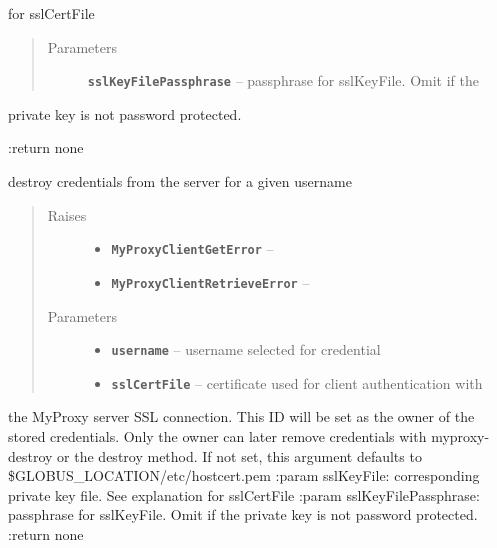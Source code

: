 \documentclass[letterpaper,10pt,english]{sphinxmanual}
\begin{document}
\begin{fulllineitems}
\begin{fulllineitems}
\begin{quote}
\begin{description}
\end{description}\end{quote}

for sslCertFile
\begin{quote}\begin{description}
\item[{Parameters}] \leavevmode
\textbf{\texttt{sslKeyFilePassphrase}} -- passphrase for sslKeyFile.  Omit if the

\end{description}\end{quote}

private key is not password protected.

:return none

\end{fulllineitems}


\begin{fulllineitems}
\label{client:myproxy.client.MyProxyClient.destroy}
destroy credentials from the server for a given username
\begin{quote}\begin{description}
\item[{Raises}] \leavevmode\begin{itemize}
\item {} 
\textbf{\texttt{MyProxyClientGetError}} -- 

\item {} 
\textbf{\texttt{MyProxyClientRetrieveError}} -- 

\end{itemize}

\item[{Parameters}] \leavevmode\begin{itemize}
\item {} 
\textbf{\texttt{username}} -- username selected for credential

\item {} 
\textbf{\texttt{sslCertFile}} -- certificate used for client authentication with

\end{itemize}

\end{description}\end{quote}

the MyProxy server SSL connection.  This ID will be set as the owner
of the stored credentials.  Only the owner can later remove 
credentials with myproxy-destroy or the destroy method.  If not set,
this argument defaults to \$GLOBUS\_LOCATION/etc/hostcert.pem 
:param sslKeyFile: corresponding private key file.  See explanation
for sslCertFile
:param sslKeyFilePassphrase: passphrase for sslKeyFile.  Omit if the
private key is not password protected.  
:return none


\end{fulllineitems}
\end{fulllineitems}
\end{document}
